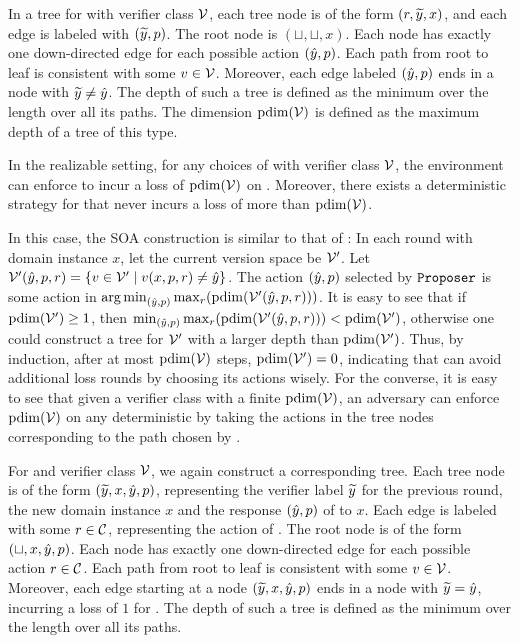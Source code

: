 \documentclass[anon]{alt2027} %
\DeclareMathOperator*{\argmin}{arg\,min}
\begin{document}
In a tree for \dt with verifier class ${\mathcal V}$, each tree node is of the form $({r},{\widetilde{y}},x)$, and each edge is labeled with $({\widetilde{y}}, {p})$. The root node is $(\sqcup,\sqcup,x)$. Each node has exactly one down-directed edge for each possible \dt action $({\hat{y}}, {p})$. Each path from root to leaf is consistent with some $v \in {\mathcal V}$. Moreover, each edge labeled $({\hat{y}}, {p})$ ends in a node with ${\widetilde{y}} \neq {\hat{y}}$. The depth of such a tree is defined as the minimum over the length over all its paths. The dimension $\mathrm{{p} dim}({\mathcal V})$ is defined as the maximum depth of a tree of this type. 

\begin{claim}
    In the realizable setting, for any  choices of \dt with verifier class ${\mathcal V}$, the environment can enforce \dt to incur a loss of $\mathrm{{p} dim}({\mathcal V})$ on \dt. Moreover, there exists a deterministic strategy for \dt that never incurs a loss of more than $\mathrm{{p} dim}({\mathcal V})$.
\end{claim}
In this case, the SOA construction is similar to that of \cite{oz2026discriminative}: In each round with domain instance $x$, let the current version space be ${\mathcal V}'$. Let 
${\mathcal V}'({\hat{y}},{p},{r}) = \{v \in {\mathcal V}' \mid v(x,{p},{r}) \neq {\hat{y}}\}$. 
The action $({\hat{y}},{p})$ selected by $\texttt{Proposer}$ is some action in   
$\argmin_{(\hy,\ct)} \max_{\cf}(\ctd(\V'(\hy,\ct,\cf)))$. It is easy to see that if $\mathrm{{p} dim}({\mathcal V}') \geq 1$, then $\min_{({\hat{y}},{p})} \max_{{r}}(\mathrm{{p} dim}({\mathcal V}'({\hat{y}},{p},{r}))) < \mathrm{{p} dim}({\mathcal V}')$, otherwise one could construct a \dt tree for ${\mathcal V}'$ with a larger depth than $\mathrm{{p} dim}({\mathcal V}')$. Thus, by induction, after at most $\mathrm{{p} dim}({\mathcal V})$ steps, $\mathrm{{p} dim}({\mathcal V}') = 0$, indicating that \dt can avoid additional loss rounds by choosing its actions wisely. For the converse, it is easy to see that given a verifier class with a finite $\mathrm{{p} dim}({\mathcal V})$, an adversary can enforce $\mathrm{{p} dim}({\mathcal V})$ on any deterministic \dt by taking the actions in the tree nodes corresponding to the path chosen by \dt.


For \df and verifier class ${\mathcal V}$, we again construct a corresponding tree. %
Each tree node is of the form $({\widetilde{y}},x,{\hat{y}}, {p})$, representing the verifier label ${\widetilde{y}}$ for the previous round, the new domain instance $x$ and the response $({\hat{y}}, {p})$ of \dt to $x$. Each edge is labeled with some ${r} \in {{\mathcal C}}$, representing the action of \df. The root node is of the form $(\sqcup,x,{\hat{y}}, {p})$. Each node has exactly one down-directed edge for each possible \df action ${r} \in {{\mathcal C}}$. Each path from root to leaf is consistent with some $v \in {\mathcal V}$. 
Moreover, each edge starting at a node $({\widetilde{y}},x,{\hat{y}}, {p})$ ends in a node with ${\widetilde{y}} = {\hat{y}}$, incurring a loss of $1$ for \df. The depth of such a tree is defined as the minimum over the length over all its paths. 
\end{document}

